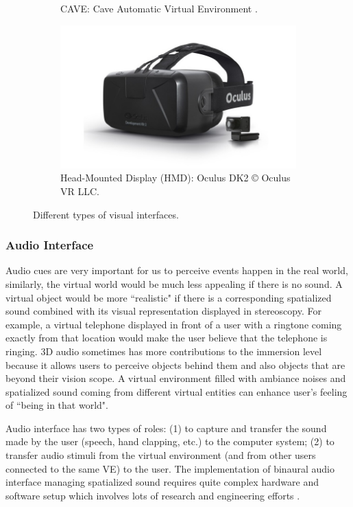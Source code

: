 \begin{figure}[htb]
\begin{subfigure}{.5\textwidth}
    \caption{CAVE\texttrademark{}: Cave Automatic Virtual Environment \citep{CruzNeira1992CAV}.}
    \label{fig:1_vi:cave}
  \end{subfigure}
  \begin{subfigure}{.45\textwidth}
    \centering
    \includegraphics[width=\linewidth]{figures/ch1/oculus}
    \caption{Head-Mounted Display (HMD): Oculus DK2 \copyright{} Oculus VR LLC.}
    \label{fig:1_vi:hmd}
  \end{subfigure}
  
  \caption{\label{fig:1_vi}Different types of visual interfaces.}
\end{figure}


\subsubsection{Audio Interface}
Audio cues are very important for us to perceive events happen in the real world, similarly, the virtual world would be much less appealing if there is no sound. A virtual object would be more ``realistic" if there is a corresponding spatialized sound combined with its visual representation displayed in stereoscopy. For example, a virtual telephone displayed in front of a user with a ringtone coming exactly from that location would make the user believe that the telephone is ringing. 3D audio sometimes has more contributions to the immersion level because it allows users to perceive objects behind them and also objects that are beyond their vision scope. A virtual environment filled with ambiance noises and spatialized sound coming from different virtual entities can enhance user's feeling of ``being in that world".

Audio interface has two types of roles: (1) to capture and transfer the sound made by the user (speech, hand clapping, etc.) to the computer system; (2) to transfer audio stimuli from the virtual environment (and from other users connected to the same VE) to the user. The implementation of binaural audio interface managing spatialized sound requires quite complex hardware and software setup which involves lots of research and engineering efforts \citep{Begault1994Sound}.

